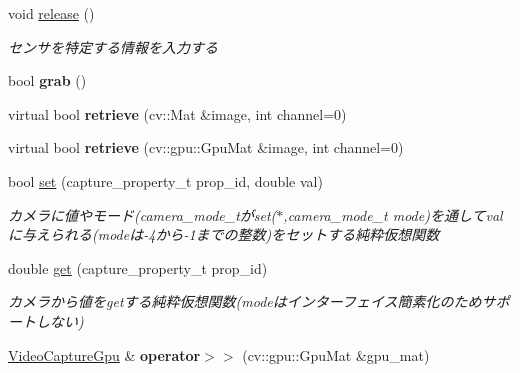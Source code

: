 \begin{DoxyCompactItemize}
void \hyperlink{classskl_1_1gpu_1_1_video_capture_gpu_ad9ccd9142fac1bfd4564df8ef660b8a8}{release} ()
\begin{DoxyCompactList}\small\item\em センサを特定する情報を入力する \end{DoxyCompactList}\item 
\hypertarget{classskl_1_1gpu_1_1_video_capture_gpu_a3dd8b97a47ca09b6f1414f68ba434be3}{}\label{classskl_1_1gpu_1_1_video_capture_gpu_a3dd8b97a47ca09b6f1414f68ba434be3} 
bool {\bfseries grab} ()
\item 
\hypertarget{classskl_1_1gpu_1_1_video_capture_gpu_a83b956c7c450fa40045437f97acfef2e}{}\label{classskl_1_1gpu_1_1_video_capture_gpu_a83b956c7c450fa40045437f97acfef2e} 
virtual bool {\bfseries retrieve} (cv\+::\+Mat \&image, int channel=0)
\item 
\hypertarget{classskl_1_1gpu_1_1_video_capture_gpu_af969b32c8038ecdbf9c241f2e01fbb43}{}\label{classskl_1_1gpu_1_1_video_capture_gpu_af969b32c8038ecdbf9c241f2e01fbb43} 
virtual bool {\bfseries retrieve} (cv\+::gpu\+::\+Gpu\+Mat \&image, int channel=0)
\item 
\hypertarget{classskl_1_1gpu_1_1_video_capture_gpu_a10caf8a02f18b92b0ae3bd0c88c51469}{}\label{classskl_1_1gpu_1_1_video_capture_gpu_a10caf8a02f18b92b0ae3bd0c88c51469} 
bool \hyperlink{classskl_1_1gpu_1_1_video_capture_gpu_a10caf8a02f18b92b0ae3bd0c88c51469}{set} (capture\+\_\+property\+\_\+t prop\+\_\+id, double val)
\begin{DoxyCompactList}\small\item\em カメラに値やモード(camera\+\_\+mode\+\_\+tがset($\ast$,camera\+\_\+mode\+\_\+t mode)を通してvalに与えられる(modeは-\/4から-\/1までの整数)をセットする純粋仮想関数 \end{DoxyCompactList}\item 
\hypertarget{classskl_1_1gpu_1_1_video_capture_gpu_ad13971c83c79a3507d529a4602cb98de}{}\label{classskl_1_1gpu_1_1_video_capture_gpu_ad13971c83c79a3507d529a4602cb98de} 
double \hyperlink{classskl_1_1gpu_1_1_video_capture_gpu_ad13971c83c79a3507d529a4602cb98de}{get} (capture\+\_\+property\+\_\+t prop\+\_\+id)
\begin{DoxyCompactList}\small\item\em カメラから値をgetする純粋仮想関数(modeはインターフェイス簡素化のためサポートしない) \end{DoxyCompactList}\item 
\hypertarget{classskl_1_1gpu_1_1_video_capture_gpu_a79f0b234dc5331fe30e4ffb76d1eb4c0}{}\label{classskl_1_1gpu_1_1_video_capture_gpu_a79f0b234dc5331fe30e4ffb76d1eb4c0} 
\hyperlink{classskl_1_1gpu_1_1_video_capture_gpu}{Video\+Capture\+Gpu} \& {\bfseries operator$>$$>$} (cv\+::gpu\+::\+Gpu\+Mat \&gpu\+\_\+mat)
\end{DoxyCompactItemize}
